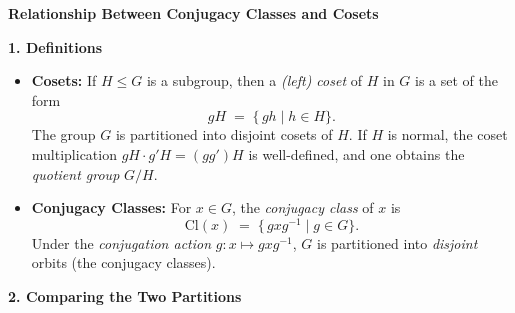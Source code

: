 \documentclass[12pt]{article}
\theoremstyle{definition} %
\theoremstyle{plain} %
\begin{document}
\noindent
\textbf{Relationship Between Conjugacy Classes and Cosets}

\bigskip

\noindent
\textbf{1. Definitions}

\begin{itemize}
    \item \textbf{Cosets:} 
    If $H \le G$ is a subgroup, then a \emph{(left) coset} of $H$ in $G$ is a set of the form 
    \[
    gH \;=\; \{\,g h \mid h \in H\}.
    \]
    The group $G$ is partitioned into disjoint cosets of $H$. If $H$ is normal, the coset multiplication $gH \cdot g'H = (gg')H$ is well-defined, and one obtains the \emph{quotient group} $G/H$.

    \item \textbf{Conjugacy Classes:}
    For $x \in G$, the \emph{conjugacy class} of $x$ is 
    \[
    \mathrm{Cl}(x) \;=\; \{\,g x g^{-1} \mid g \in G\}.
    \]
    Under the \emph{conjugation action} $g: x \mapsto g x g^{-1}$, $G$ is partitioned into \emph{disjoint} orbits (the conjugacy classes).

\end{itemize}

\bigskip

\noindent
\textbf{2. Comparing the Two Partitions}
\end{document}

